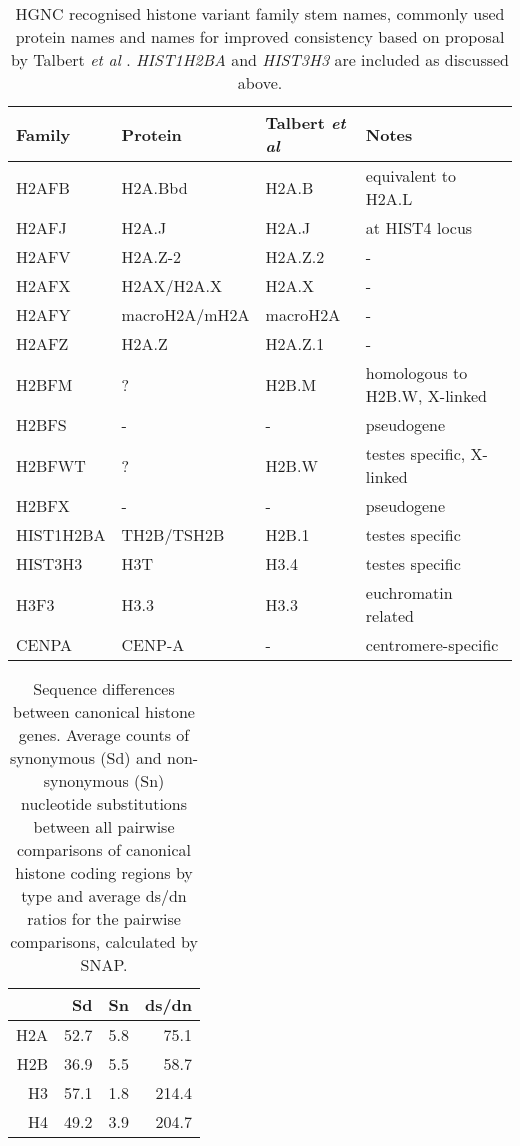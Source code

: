   \newpage
  \begin{table*}
    \caption{HGNC recognised histone variant family stem names, commonly used protein names
             and names for improved consistency based on proposal by Talbert \textit{et al} \citep{Talbert2012}.
             \textit{HIST1H2BA} and \textit{HIST3H3} are included as discussed above.}
    \label{tab:histone-variant-families}
    \centering
    \begin{tabular}{l l l l}
      \toprule
      Family & Protein & Talbert \textit{et al} & Notes \\
      \midrule
      H2AFB & H2A.Bbd & H2A.B & equivalent to H2A.L \\
      H2AFJ & H2A.J & H2A.J & at HIST4 locus \\
      H2AFV & H2A.Z-2 & H2A.Z.2 & - \\
      H2AFX & H2AX/H2A.X & H2A.X & - \\
      H2AFY & macroH2A/mH2A & macroH2A & - \\
      H2AFZ & H2A.Z & H2A.Z.1 & - \\
      H2BFM & ? & H2B.M & homologous to H2B.W, X-linked\\
      H2BFS & - & - & pseudogene \\
      H2BFWT & ? & H2B.W & testes specific, X-linked \\
      H2BFX & - & - & pseudogene \\
      HIST1H2BA & TH2B/TSH2B & H2B.1 & testes specific \\
      HIST3H3 & H3T & H3.4 & testes specific \\
      H3F3 & H3.3 & H3.3 & euchromatin related \\
      CENPA & CENP-A & - & centromere-specific \\
      \bottomrule
    \end{tabular}
  \end{table*}

  \newpage
  \begin{table*}
    \caption{Sequence differences between canonical histone genes.
             Average counts of synonymous (Sd) and non-synonymous (Sn) nucleotide substitutions
             between all pairwise comparisons of canonical histone coding regions by type
             and average ds/dn ratios for the pairwise comparisons,
             calculated by SNAP.}
    \label{tab:histone-gene-differences}
    \centering
    \begin{tabular}{r r r r}
      \toprule
      \null & Sd & Sn & ds/dn \\
      \midrule
      H2A & 52.7 & 5.8 & 75.1 \\
      H2B & 36.9 & 5.5 & 58.7 \\
      H3 & 57.1 & 1.8 & 214.4 \\
      H4 & 49.2 & 3.9 & 204.7 \\
      \bottomrule
    \end{tabular}
  \end{table*}

